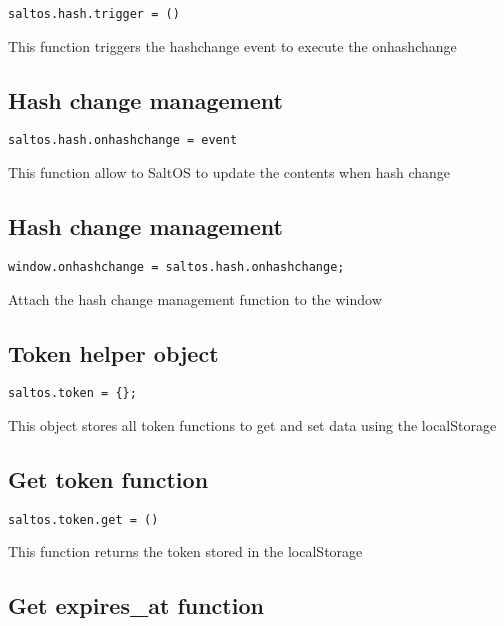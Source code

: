 \documentclass[a4paper]{book}
\begin{document}
\begin{lstlisting}
saltos.hash.trigger = ()
\end{lstlisting}

This function triggers the hashchange event to execute the onhashchange

\hypertarget{toc432}{}
\subsection{Hash change management}

\begin{lstlisting}
saltos.hash.onhashchange = event
\end{lstlisting}

This function allow to SaltOS to update the contents when hash change

\hypertarget{toc433}{}
\subsection{Hash change management}

\begin{lstlisting}
window.onhashchange = saltos.hash.onhashchange;
\end{lstlisting}

Attach the hash change management function to the window

\hypertarget{toc434}{}
\subsection{Token helper object}

\begin{lstlisting}
saltos.token = {};
\end{lstlisting}

This object stores all token functions to get and set data using the localStorage

\hypertarget{toc435}{}
\subsection{Get token function}

\begin{lstlisting}
saltos.token.get = ()
\end{lstlisting}

This function returns the token stored in the localStorage

\hypertarget{toc436}{}
\subsection{Get expires\_at function}
\end{document}
